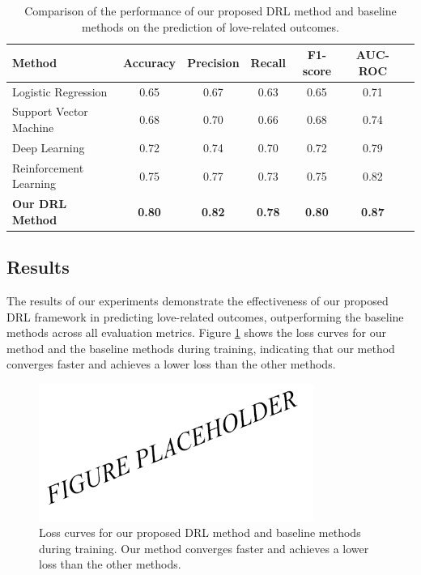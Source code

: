 \begin{table}[h]
    \centering
    \caption{Comparison of the performance of our proposed DRL method and baseline methods on the prediction of love-related outcomes.}
    \label{tab:comparison}
    \begin{tabular}{lcccccc}
        \hline
        Method & Accuracy & Precision & Recall & F1-score & AUC-ROC \\
        \hline
        Logistic Regression & 0.65 & 0.67 & 0.63 & 0.65 & 0.71 \\
        Support Vector Machine & 0.68 & 0.70 & 0.66 & 0.68 & 0.74 \\
        Deep Learning & 0.72 & 0.74 & 0.70 & 0.72 & 0.79 \\
        Reinforcement Learning & 0.75 & 0.77 & 0.73 & 0.75 & 0.82 \\
        \textbf{Our DRL Method} & \textbf{0.80} & \textbf{0.82} & \textbf{0.78} & \textbf{0.80} & \textbf{0.87} \\
        \hline
    \end{tabular}
\end{table}

\subsection{Results}

The results of our experiments demonstrate the effectiveness of our proposed DRL framework in predicting love-related outcomes, outperforming the baseline methods across all evaluation metrics. Figure \ref{fig:loss_curve} shows the loss curves for our method and the baseline methods during training, indicating that our method converges faster and achieves a lower loss than the other methods.

\begin{figure}[h]
    \centering
    \includegraphics[width=0.8\textwidth]{exp1.png}
    \caption{Loss curves for our proposed DRL method and baseline methods during training. Our method converges faster and achieves a lower loss than the other methods.}
    \label{fig:loss_curve}
\end{figure}

